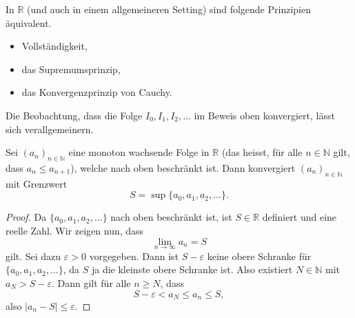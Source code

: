 \documentclass[../main.tex]{subfiles}
\begin{document}
\begin{remark}
  In $\mathbb{R}$ (und auch
  in einem allgemeineren Setting)
  sind folgende Prinzipien äquivalent.
  \begin{itemize}
    \item Vollständigkeit,
    \item das Supremumsprinzip,
    \item das Konvergenzprinzip von Cauchy.
  \end{itemize}
  
\end{remark}


Die Beobachtung, dass die Folge $I_0, I_1, I_2, \dots$
im Beweis oben konvergiert, lässt sich verallgemeinern.

\begin{claim}[Monotononieprinzip]
  Sei ${(a_n)}_{n \in \mathbb{N}}$ eine monoton wachsende
  Folge in $\mathbb{R}$ (das heisst, für alle
  $n \in \mathbb{N}$ gilt, dass $a_n \leq a_{n+1}$),
  welche nach oben beschränkt ist.
  Dann konvergiert ${(a_n)}_{n \in \mathbb{N}}$ mit
  Grenzwert
  \[
    S = \sup \{a_0, a_1, a_2, \dots\}.
  \]
\end{claim}

\begin{proof}
  Da $\{a_0, a_1, a_2, \dots\}$ nach oben beschränkt ist,
  ist $S \in \mathbb{R}$ definiert und eine reelle Zahl.
  Wir zeigen nun, dass
  \[
    \lim_{n \to \infty} a_n = S
  \]
  gilt.
  Sei dazu $\varepsilon > 0$ vorgegeben. 
  Dann ist $S - \varepsilon$ keine obere Schranke
  für $\{a_0, a_1, a_2, \dots\}$,
  da $S$ ja die kleinste obere Schranke ist.
  Also existiert $N \in \mathbb{N}$ mit
  $a_N > S - \varepsilon$.
  Dann gilt für alle $n \geq N$, dass
  \[
    S - \varepsilon < a_N \leq a_n \leq S,
  \]
  also $|a_n - S| \leq \varepsilon$.
\end{proof}
\end{document}
